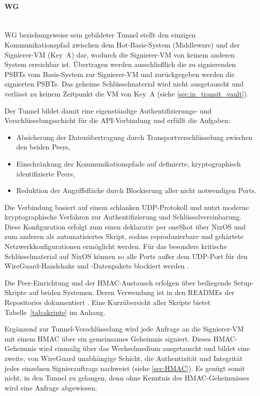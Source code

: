 \paragraph{\ac{WG}} \mbox{}\\
\ac{WG} beziehungsweise sein gebildeter Tunnel stellt den einzigen Kommunikationspfad zwischen dem Hot-Basis-System (Middleware) und der Signierer-\ac{VM} (Key~A) dar, wodurch die Signierer-\ac{VM} von keinem anderen System erreichbar ist. Übertragen werden ausschließlich die zu signierenden \acp{PSBT} vom Basis-System zur Signierer-\ac{VM} und zurückgegeben werden die signierten \acp{PSBT}. Das geheime Schlüsselmaterial wird nicht ausgetauscht und verlässt zu keinem Zeitpunkt die \ac{VM} von Key~A (siehe \ref{sec:in_transit_vault}).

Der Tunnel bildet damit eine eigenständige Authentifizierungs- und Verschlüsselungsschicht für die \ac{API}-Verbindung und erfüllt die Aufgaben:
\begin{itemize}
    \item Absicherung der Datenübertragung durch Transportverschlüsselung zwischen den beiden Peers,
    \item Einschränkung der Kommunikationspfade auf definierte, kryptographisch identifizierte Peers,
    \item Reduktion der Angriffsfläche durch Blockierung aller nicht notwendigen Ports.
\end{itemize}

Die Verbindung basiert auf einem schlanken \ac{UDP}-Protokoll und nutzt moderne kryptographische Verfahren zur Authentifizierung und Schlüsselvereinbarung.
Diese Konfiguration erfolgt zum einen deklarativ per oneShot über NixOS und zum anderen als automatisiertes Skript, sodass reproduzierbare und gehärtete Netzwerkkonfigurationen ermöglicht werden.
Für das besonders kritische Schlüsselmaterial auf NixOS können so alle Ports außer dem \ac{UDP}-Port für den WireGuard-Handshake und -Datenpakete blockiert werden \cite{wireguard}.

Die Peer-Einrichtung und der HMAC-Austausch erfolgen über beiliegende Setup-Skripte auf beiden Systemen. Deren Verwendung ist in den READMEs der Repositories dokumentiert \cite{NixOsHot_github, Krypto_Basis_github}. Eine Kurzübersicht aller Skripte bietet Tabelle~\ref{tab:skripte} im Anhang.

Ergänzend zur Tunnel-Verschlüsselung wird jede Anfrage an die Signierer-\ac{VM} mit einem \ac{HMAC} über ein gemeinsames Geheimnis signiert. Dieses \ac{HMAC}-Geheimnis wird einmalig über das Wechselmedium ausgetauscht und bildet eine zweite, von WireGuard unabhängige Schicht, die Authentizität und Integrität jedes einzelnen Signierauftrags nachweist (siehe \ref{sec:HMAC}). Es genügt somit nicht, in den Tunnel zu gelangen, denn ohne Kenntnis des \ac{HMAC}-Geheimnisses wird eine Anfrage abgewiesen.


